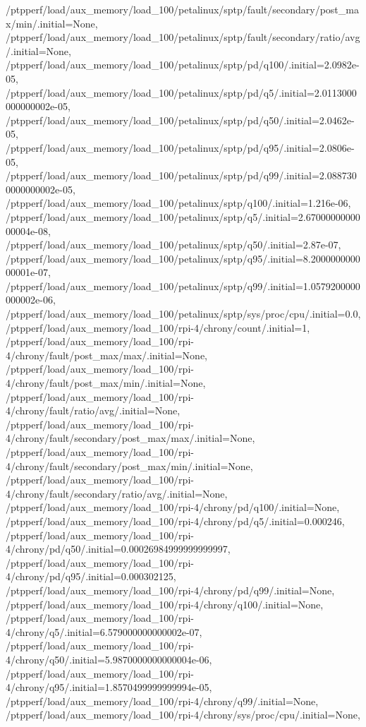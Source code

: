 {    /ptpperf/load/aux_memory/load_100/petalinux/sptp/fault/secondary/post_max/min/.initial=None,
    /ptpperf/load/aux_memory/load_100/petalinux/sptp/fault/secondary/ratio/avg/.initial=None,
    /ptpperf/load/aux_memory/load_100/petalinux/sptp/pd/q100/.initial=2.0982e-05,
    /ptpperf/load/aux_memory/load_100/petalinux/sptp/pd/q5/.initial=2.0113000000000002e-05,
    /ptpperf/load/aux_memory/load_100/petalinux/sptp/pd/q50/.initial=2.0462e-05,
    /ptpperf/load/aux_memory/load_100/petalinux/sptp/pd/q95/.initial=2.0806e-05,
    /ptpperf/load/aux_memory/load_100/petalinux/sptp/pd/q99/.initial=2.0887300000000002e-05,
    /ptpperf/load/aux_memory/load_100/petalinux/sptp/q100/.initial=1.216e-06,
    /ptpperf/load/aux_memory/load_100/petalinux/sptp/q5/.initial=2.6700000000000004e-08,
    /ptpperf/load/aux_memory/load_100/petalinux/sptp/q50/.initial=2.87e-07,
    /ptpperf/load/aux_memory/load_100/petalinux/sptp/q95/.initial=8.200000000000001e-07,
    /ptpperf/load/aux_memory/load_100/petalinux/sptp/q99/.initial=1.0579200000000002e-06,
    /ptpperf/load/aux_memory/load_100/petalinux/sptp/sys/proc/cpu/.initial=0.0,
    /ptpperf/load/aux_memory/load_100/rpi-4/chrony/count/.initial=1,
    /ptpperf/load/aux_memory/load_100/rpi-4/chrony/fault/post_max/max/.initial=None,
    /ptpperf/load/aux_memory/load_100/rpi-4/chrony/fault/post_max/min/.initial=None,
    /ptpperf/load/aux_memory/load_100/rpi-4/chrony/fault/ratio/avg/.initial=None,
    /ptpperf/load/aux_memory/load_100/rpi-4/chrony/fault/secondary/post_max/max/.initial=None,
    /ptpperf/load/aux_memory/load_100/rpi-4/chrony/fault/secondary/post_max/min/.initial=None,
    /ptpperf/load/aux_memory/load_100/rpi-4/chrony/fault/secondary/ratio/avg/.initial=None,
    /ptpperf/load/aux_memory/load_100/rpi-4/chrony/pd/q100/.initial=None,
    /ptpperf/load/aux_memory/load_100/rpi-4/chrony/pd/q5/.initial=0.000246,
    /ptpperf/load/aux_memory/load_100/rpi-4/chrony/pd/q50/.initial=0.00026984999999999997,
    /ptpperf/load/aux_memory/load_100/rpi-4/chrony/pd/q95/.initial=0.000302125,
    /ptpperf/load/aux_memory/load_100/rpi-4/chrony/pd/q99/.initial=None,
    /ptpperf/load/aux_memory/load_100/rpi-4/chrony/q100/.initial=None,
    /ptpperf/load/aux_memory/load_100/rpi-4/chrony/q5/.initial=6.579000000000002e-07,
    /ptpperf/load/aux_memory/load_100/rpi-4/chrony/q50/.initial=5.9870000000000004e-06,
    /ptpperf/load/aux_memory/load_100/rpi-4/chrony/q95/.initial=1.8570499999999994e-05,
    /ptpperf/load/aux_memory/load_100/rpi-4/chrony/q99/.initial=None,
    /ptpperf/load/aux_memory/load_100/rpi-4/chrony/sys/proc/cpu/.initial=None,
}
